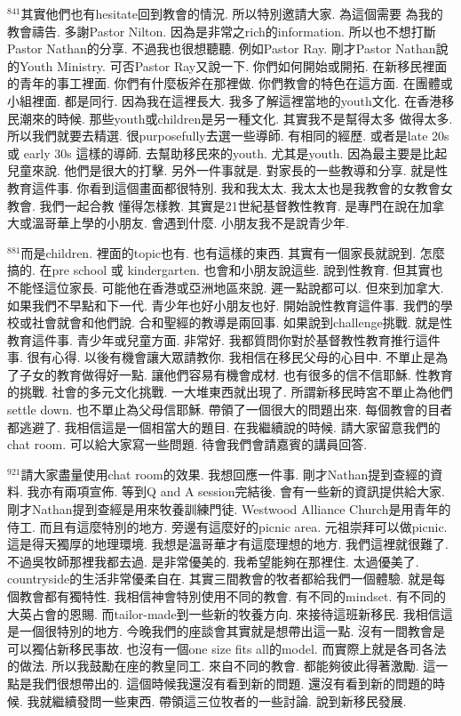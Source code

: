 \documentclass{book}
\begin{document}
$^{841}$其實他們也有hesitate回到教會的情況.
所以特別邀請大家.
為這個需要 為我的教會禱告.
多謝Pastor Nilton.
因為是非常之rich的information.
所以也不想打斷Pastor Nathan的分享.
不過我也很想聽聽.
例如Pastor Ray.
剛才Pastor Nathan說的Youth Ministry.
可否Pastor Ray又說一下.
你們如何開始或開拓.
在新移民裡面的青年的事工裡面.
你們有什麼板斧在那裡做.
你們教會的特色在這方面.
在團體或小組裡面.
都是同行.
因為我在這裡長大.
我多了解這裡當地的youth文化.
在香港移民潮來的時候.
那些youth或children是另一種文化.
其實我不是幫得太多 做得太多.
所以我們就要去精選.
很purposefully去選一些導師.
有相同的經歷.
或者是late 20s 或 early 30s 這樣的導師.
去幫助移民來的youth.
尤其是youth.
因為最主要是比起兒童來說.
他們是很大的打擊.
另外一件事就是.
對家長的一些教導和分享.
就是性教育這件事.
你看到這個畫面都很特別.
我和我太太.
我太太也是我教會的女教會女教會.
我們一起合教 懂得怎樣教.
其實是21世紀基督教性教育.
是專門在說在加拿大或溫哥華上學的小朋友.
會遇到什麼.
小朋友我不是說青少年.

$^{881}$而是children.
裡面的topic也有.
也有這樣的東西.
其實有一個家長就說到.
怎麼搞的.
在pre school 或 kindergarten.
也會和小朋友說這些.
說到性教育.
但其實也不能怪這位家長.
可能他在香港或亞洲地區來說.
遲一點說都可以.
但來到加拿大.
如果我們不早點和下一代.
青少年也好小朋友也好.
開始說性教育這件事.
我們的學校或社會就會和他們說.
合和聖經的教導是兩回事.
如果說到challenge挑戰.
就是性教育這件事.
青少年或兒童方面.
非常好.
我都質問你對於基督教性教育推行這件事.
很有心得.
以後有機會讓大眾請教你.
我相信在移民父母的心目中.
不單止是為了子女的教育做得好一點.
讓他們容易有機會成材.
也有很多的信不信耶穌.
性教育的挑戰.
社會的多元文化挑戰.
一大堆東西就出現了.
所謂新移民時宮不單止為他們settle down.
也不單止為父母信耶穌.
帶領了一個很大的問題出來.
每個教會的目者都逃避了.
我相信這是一個相當大的題目.
在我繼續說的時候.
請大家留意我們的chat room.
可以給大家寫一些問題.
待會我們會請嘉賓的講員回答.

$^{921}$請大家盡量使用chat room的效果.
我想回應一件事.
剛才Nathan提到查經的資料.
我亦有兩項宣佈.
等到Q and A session完結後.
會有一些新的資訊提供給大家.
剛才Nathan提到查經是用來牧養訓練門徒.
Westwood Alliance Church是用青年的侍工.
而且有這麼特別的地方.
旁邊有這麼好的picnic area.
元祖崇拜可以做picnic.
這是得天獨厚的地理環境.
我想是溫哥華才有這麼理想的地方.
我們這裡就很難了.
不過吳牧師那裡我都去過.
是非常優美的.
我希望能夠在那裡住.
太過優美了.
countryside的生活非常優柔自在.
其實三間教會的牧者都給我們一個體驗.
就是每個教會都有獨特性.
我相信神會特別使用不同的教會.
有不同的mindset.
有不同的大英占會的恩賜.
而tailor-made到一些新的牧養方向.
來接待這班新移民.
我相信這是一個很特別的地方.
今晚我們的座談會其實就是想帶出這一點.
沒有一間教會是可以獨佔新移民事故.
也沒有一個one size fits all的model.
而實際上就是各司各法的做法.
所以我鼓勵在座的教皇同工.
來自不同的教會.
都能夠彼此得著激勵.
這一點是我們很想帶出的.
這個時候我還沒有看到新的問題.
還沒有看到新的問題的時候.
我就繼續發問一些東西.
帶領這三位牧者的一些討論.
說到新移民發展.
\end{document}
